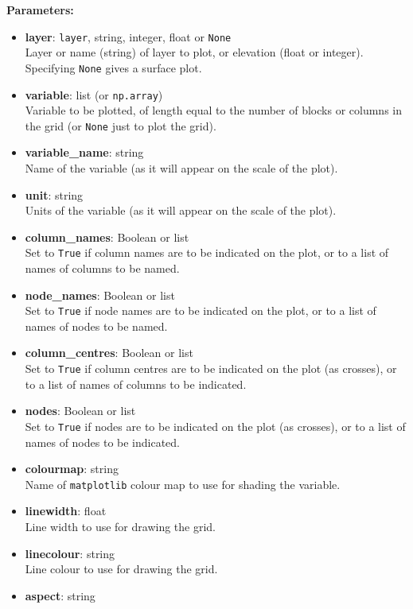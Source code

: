 \textbf{Parameters:}
\begin{itemize}
\item \textbf{layer}: \texttt{layer}, string, integer, float or \texttt{None}\\
  Layer or name (string) of layer to plot, or elevation (float or integer).  Specifying \texttt{None} gives a surface plot.
\item \textbf{variable}: list (or \texttt{np.array})\\
  Variable to be plotted, of length equal to the number of blocks or columns in the grid (or \texttt{None} just to plot the grid).
\item \textbf{variable\_name}: string\\
  Name of the variable (as it will appear on the scale of the plot).
\item \textbf{unit}: string\\
  Units of the variable (as it will appear on the scale of the plot).
\item \textbf{column\_names}: Boolean or list\\
  Set to \texttt{True} if column names are to be indicated on the plot, or to a list of names of columns to be named.
\item \textbf{node\_names}: Boolean or list\\
  Set to \texttt{True} if node names are to be indicated on the plot, or to a list of names of nodes to be named.
\item \textbf{column\_centres}: Boolean or list\\
  Set to \texttt{True} if column centres are to be indicated on the plot (as crosses), or to a list of names of columns to be indicated.
\item \textbf{nodes}: Boolean or list\\
  Set to \texttt{True} if nodes are to be indicated on the plot (as crosses), or to a list of names of nodes to be indicated.
\item \textbf{colourmap}: string\\
  Name of \texttt{matplotlib} colour map to use for shading the variable.
\item \textbf{linewidth}: float\\
  Line width to use for drawing the grid.
\item \textbf{linecolour}: string\\
  Line colour to use for drawing the grid.
\item \textbf{aspect}: string\\

\end{itemize}

